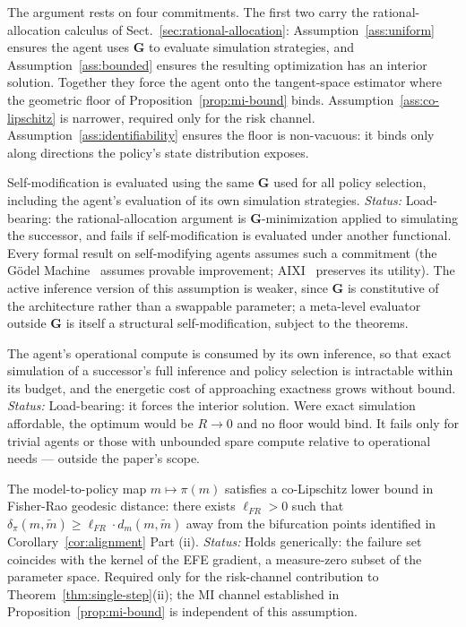 \documentclass[runningheads]{llncs}
\begin{document}
The argument rests on four commitments. The first two carry the
rational-allocation calculus of Sect.~\ref{sec:rational-allocation}:
Assumption~\ref{ass:uniform} ensures the agent uses $\mathbf{G}$ to evaluate
simulation strategies, and Assumption~\ref{ass:bounded} ensures the resulting
optimization has an interior solution. Together they force the agent onto the
tangent-space estimator where the geometric floor of
Proposition~\ref{prop:mi-bound} binds. Assumption~\ref{ass:co-lipschitz} is
narrower, required only for the risk channel.
Assumption~\ref{ass:identifiability} ensures the floor is non-vacuous: it binds
only along directions the policy's state distribution exposes.

\begin{assumption}
\label{ass:uniform}
Self-modification is evaluated using the same $\mathbf{G}$ used for all policy selection, including the agent's evaluation of its own simulation strategies. \emph{Status:} Load-bearing: the rational-allocation argument is $\mathbf{G}$-minimization applied to simulating the successor, and fails if self-modification is evaluated under another functional. Every formal result on self-modifying agents assumes such a commitment (the G\"odel Machine~\cite{schmidhuber2007} assumes provable improvement; AIXI~\cite{everitt2016} preserves its utility). The active inference version of this assumption is weaker, since $\mathbf{G}$ is constitutive of the architecture rather than a swappable parameter; a meta-level evaluator outside $\mathbf{G}$ is itself a structural self-modification, subject to the theorems.
\end{assumption}

\begin{assumption}
\label{ass:bounded}
The agent's operational compute is consumed by its own inference, so that exact simulation of a successor's full inference and policy selection is intractable within its budget, and the energetic cost of approaching exactness grows without bound. \emph{Status:} Load-bearing: it forces the interior solution. Were exact simulation affordable, the optimum would be $R \to 0$ and no floor would bind. It fails only for trivial agents or those with unbounded spare compute relative to operational needs --- outside the paper's scope.
\end{assumption}

\begin{assumption}
\label{ass:co-lipschitz}
The model-to-policy map $m \mapsto \pi(m)$ satisfies a co-Lipschitz lower bound in Fisher-Rao geodesic distance: there exists $\ell_{FR} > 0$ such that $\delta_\pi(m, \tilde{m}) \geq \ell_{FR} \cdot d_m(m, \tilde{m})$ away from the bifurcation points identified in Corollary~\ref{cor:alignment} Part (ii). \emph{Status:} Holds generically: the failure set coincides with the kernel of the EFE gradient, a measure-zero subset of the parameter space. Required only for the risk-channel contribution to Theorem~\ref{thm:single-step}(ii); the MI channel established in Proposition~\ref{prop:mi-bound} is independent of this assumption.
\end{assumption}
\end{document}
